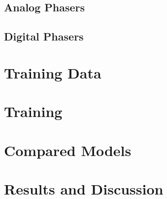 \subsection{Analog Phasers}

\subsection{Digital Phasers}

\section{Training Data}
\label{sec:phaser_training_data}

\section{Training}
\label{sec:phaser_training}

\section{Compared Models}
\label{sec:phaser_models}

\section{Results and Discussion}
\label{sec:phaser_results}

